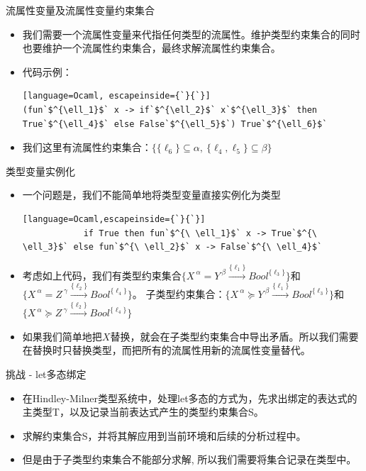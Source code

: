 \documentclass[9pt]{beamer}
\begin{document}
\begin{frame}[fragile]{流属性变量及流属性变量约束集合}
	\begin{itemize}
		\item 我们需要一个流属性变量来代指任何类型的流属性。维护类型约束集合的同时也要维护一个流属性约束集合，最终求解流属性约束集合。
		\vspace{0.3em}
		\item 代码示例：
		\vspace{0.2em}
		\begin{lstlisting}[language=Ocaml, escapeinside={`}{`}]
(fun`$^{\ell_1}$` x -> if`$^{\ell_2}$` x`$^{\ell_3}$` then True`$^{\ell_4}$` else False`$^{\ell_5}$`) True`$^{\ell_6}$`
		\end{lstlisting}
		\vspace{0.3em}
		\item 我们这里有流属性约束集合：$\{\{\ell_6\}\subseteq\alpha,\ \{\ell_4, \ell_5\}\subseteq \beta\}$
	\end{itemize}
\end{frame}

\begin{frame}[fragile]{类型变量实例化}
	\begin{itemize}
		\item 一个问题是，我们不能简单地将类型变量直接实例化为类型
		\begin{lstlisting}[language=Ocaml,escapeinside={`}{`}]
			if True then fun`$^{\ \ell_1}$` x -> True`$^{\ \ell_3}$` else fun`$^{\ \ell_2}$` x -> False`$^{\ \ell_4}$`
		\end{lstlisting}
		\vspace{0.2em}
		\item 考虑如上代码，我们有类型约束集合$\{X^{\ \alpha} = Y^{\ \beta}\xrightarrow{\{\ell_1\}}Bool^{\{\ell_3\}}\}$和$\{X^{\ \alpha} = Z^{\ \gamma}\xrightarrow{\{\ell_2\}}Bool^{\{\ell_4\}}\}$。 子类型约束集合：$\{X^{\ \alpha} \succeq Y^{\ \beta}\xrightarrow{\{\ell_1\}}Bool^{\{\ell_3\}}\}$和$\{X^{\ \alpha} \succeq Z^{\ \gamma}\xrightarrow{\{\ell_2\}}Bool^{\{\ell_4\}}\}$
		\vspace{0.2em}
		\item 如果我们简单地把$X$替换，就会在子类型约束集合中导出矛盾。所以我们需要在替换时只替换类型，而把所有的流属性用新的流属性变量替代。
	\end{itemize}
\end{frame}

\begin{frame}[fragile]{挑战 - let多态绑定}
	\begin{itemize}
		\item 在Hindley-Milner类型系统中，处理let多态的方式为，先求出绑定的表达式的主类型T，以及记录当前表达式产生的类型约束集合S。
		\vspace{0.2em}
		\item 求解约束集合S，并将其解应用到当前环境和后续的分析过程中。
		\vspace{0.2em}
		\item 但是由于子类型约束集合不能部分求解, 所以我们需要将集合记录在类型中。
	\end{itemize}
\end{frame}
\end{document}
